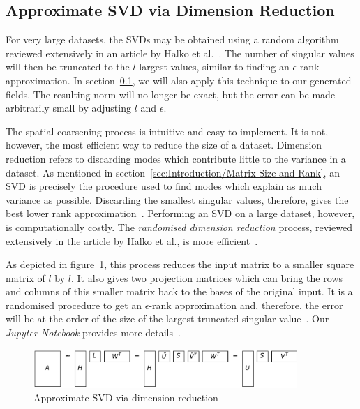 \documentclass[ijgi,article,submit,moreauthors,pdftex,10pt,a4paper]{Definitions/mdpi}
\begin{document}
\subsection{Approximate SVD via Dimension Reduction}
\label{sec:Results/Approximate SVD via Dimension Reduction}

For very large datasets, the SVDs may be obtained using a random algorithm reviewed extensively in an article by Halko et al.~\cite{Halko2011}. The number of singular values will then be truncated to the $l$ largest values, similar to finding an $\epsilon$-rank approximation. In section~\ref{sec:Results/Approximate SVD via Dimension Reduction}, we will also apply this technique to our generated fields. The resulting norm will no longer be exact, but the error can be made arbitrarily small by adjusting $l$ and $\epsilon$.

The spatial coarsening process is intuitive and easy to implement. It is not, however, the most efficient way to reduce the size of a dataset. Dimension reduction refers to discarding modes which contribute little to the variance in a dataset. As mentioned in section~\ref{sec:Introduction/Matrix Size and Rank}, an SVD is precisely the procedure used to find modes which explain as much variance as possible. Discarding the smallest singular values, therefore, gives the best lower rank approximation~\cite{Eckart1936, Martinsson2016}. Performing an SVD on a large dataset, however, is computationally costly. The \textit{randomised dimension reduction} process, reviewed extensively in the article by Halko et al., is more efficient~\cite{Halko2011, Li2016}.

As depicted in figure~\ref{fig:reduceSizeRandomisedSquare}, this process reduces the input matrix to a smaller square matrix of $l$ by $l$. It also gives two projection matrices which can bring the rows and columns of this smaller matrix back to the bases of the original input. It is a randomised procedure to get an $\epsilon$-rank approximation and, therefore, the error will be at the order of the size of the largest truncated singular value~\cite{Martinsson2016, Halko2011}. Our \textit{Jupyter Notebook} provides more details~\cite{Bogaardt2018}.

\begin{figure}[H]
\centering
\includegraphics[width=100mm]{Results/reduceSizeRandomisedSquare.pdf}
\caption[Approximate randomised SVD]{Approximate SVD via dimension reduction}
\label{fig:reduceSizeRandomisedSquare}
\end{figure}
\end{document}
